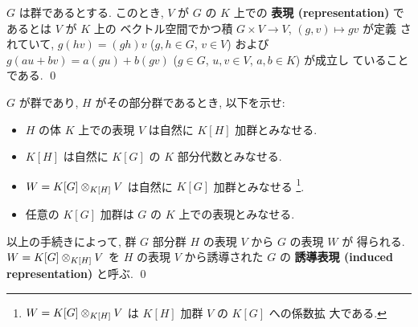 \documentclass[12pt,twoside]{jarticle}
\begin{document}
\begin{definition}[群の表現]
  $G$ は群であるとする. このとき, $V$ が $G$ の $K$ 上での
  {\bf 表現 (representation)} であるとは $V$ が $K$ 上の
  ベクトル空間でかつ積 $G\times V\to V$, $(g,v)\mapsto gv$ が定義
  されていて, $g(hv)=(gh)v$ ($g,h\in G$, $v\in V$) 
  および $g(au+bv)=a(gu)+b(gv)$ ($g\in G$, $u,v\in V$, $a,b\in K$) が成立し
  ていることである. 
  \qed
\end{definition}

\begin{question}[誘導表現]
  $G$ が群であり, $H$ がその部分群であるとき, 以下を示せ:
  \begin{itemize}
  \item[(1)] $H$ の体 $K$ 上での表現 $V$ は自然に $K[H]$ 加群とみなせる.
  \item[(2)] $K[H]$ は自然に $K[G]$ の $K$ 部分代数とみなせる.
  \item[(3)] $W = K[G]\otimes_{K[H]} V$ は自然に $K[G]$ 加群とみなせる%
    \footnote{$W = K[G]\otimes_{K[H]} V$ は $K[H]$ 加群 $V$ の $K[G]$ への係数拡
      大である.}.
  \item[(4)] 任意の $K[G]$ 加群は $G$ の $K$ 上での表現とみなせる.
  \end{itemize}
  以上の手続きによって, 群 $G$ 部分群 $H$ の表現 $V$ から $G$ の表現 $W$ が
  得られる. $W = K[G]\otimes_{K[H]} V$ を $H$ の表現 $V$ から誘導された $G$ の
  {\bf 誘導表現 (induced representation)} と呼ぶ. 
  \qed
\end{question}
\end{document}
